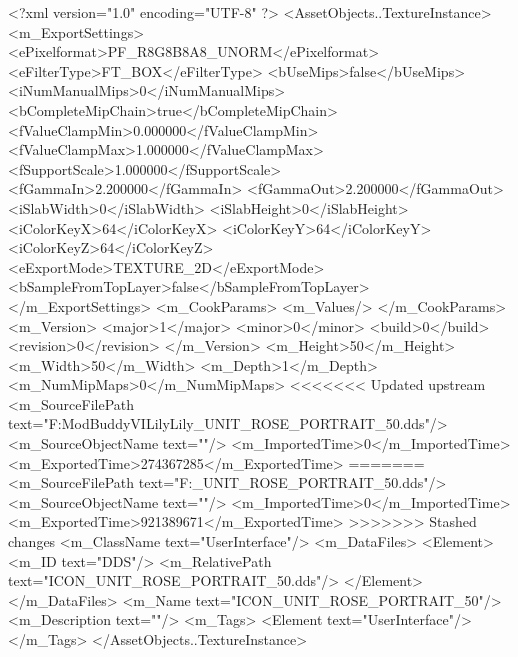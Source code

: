 <?xml version="1.0" encoding="UTF-8" ?>
<AssetObjects..TextureInstance>
	<m_ExportSettings>
		<ePixelformat>PF_R8G8B8A8_UNORM</ePixelformat>
		<eFilterType>FT_BOX</eFilterType>
		<bUseMips>false</bUseMips>
		<iNumManualMips>0</iNumManualMips>
		<bCompleteMipChain>true</bCompleteMipChain>
		<fValueClampMin>0.000000</fValueClampMin>
		<fValueClampMax>1.000000</fValueClampMax>
		<fSupportScale>1.000000</fSupportScale>
		<fGammaIn>2.200000</fGammaIn>
		<fGammaOut>2.200000</fGammaOut>
		<iSlabWidth>0</iSlabWidth>
		<iSlabHeight>0</iSlabHeight>
		<iColorKeyX>64</iColorKeyX>
		<iColorKeyY>64</iColorKeyY>
		<iColorKeyZ>64</iColorKeyZ>
		<eExportMode>TEXTURE_2D</eExportMode>
		<bSampleFromTopLayer>false</bSampleFromTopLayer>
	</m_ExportSettings>
	<m_CookParams>
		<m_Values/>
	</m_CookParams>
	<m_Version>
		<major>1</major>
		<minor>0</minor>
		<build>0</build>
		<revision>0</revision>
	</m_Version>
	<m_Height>50</m_Height>
	<m_Width>50</m_Width>
	<m_Depth>1</m_Depth>
	<m_NumMipMaps>0</m_NumMipMaps>
<<<<<<< Updated upstream
	<m_SourceFilePath text="F:\1\Firaxis ModBuddy\Civilization VI\Assault Lily\Assault Lily\Textures\ICON_UNIT_ROSE_PORTRAIT_50.dds"/>
	<m_SourceObjectName text=""/>
	<m_ImportedTime>0</m_ImportedTime>
	<m_ExportedTime>274367285</m_ExportedTime>
=======
	<m_SourceFilePath text="F:\DT\lilyimages\all\ICON_UNIT_ROSE_PORTRAIT_50.dds"/>
	<m_SourceObjectName text=""/>
	<m_ImportedTime>0</m_ImportedTime>
	<m_ExportedTime>921389671</m_ExportedTime>
>>>>>>> Stashed changes
	<m_ClassName text="UserInterface"/>
	<m_DataFiles>
		<Element>
			<m_ID text="DDS"/>
			<m_RelativePath text="ICON_UNIT_ROSE_PORTRAIT_50.dds"/>
		</Element>
	</m_DataFiles>
	<m_Name text="ICON_UNIT_ROSE_PORTRAIT_50"/>
	<m_Description text=""/>
	<m_Tags>
		<Element text="UserInterface"/>
	</m_Tags>
</AssetObjects..TextureInstance>

